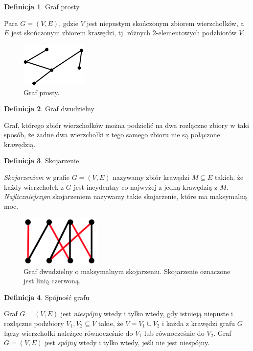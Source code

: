 \documentclass{xmgr}
\theoremstyle{definition}
\newtheorem{Definicja}{Definicja}
\begin{document}
\begin{Definicja}{Graf prosty}

  Para $G = (V,E)$, gdzie $V$ jest niepustym skończonym zbiorem wierzchołków, a $E$ jest skończonym zbiorem krawędzi, tj. różnych 2-elementowych podzbiorów $V$.
\end{Definicja}

\begin{figure}[ht!]
  \centering
  \includegraphics[height=2.2cm]{rysunki/spojny_graf_prosty.png}
    \caption{Graf prosty.}
\end{figure} 

\begin{Definicja}{Graf dwudzielny}

	Graf, którego zbiór wierzchołków można podzielić na dwa rozłączne zbiory w taki sposób, że żadne dwa wierzchołki z tego samego zbioru nie są połączone krawędzią.
\end{Definicja}

\begin{Definicja}{Skojarzenie}

  \emph{Skojarzeniem} w grafie $G=(V,E)$ nazywamy zbiór krawędzi $M \subseteq E$ takich, że każdy wierzchołek z $G$ jest incydentny co najwyżej z jedną krawędzią z $M$. \emph{Najliczniejszym} skojarzeniem nazywamy takie skojarzenie, które ma maksymalną moc.   
\end{Definicja}

\begin{figure}[ht!]
  \centering
  \includegraphics[height=2.5cm]{rysunki/graf_dwudzielny_skojarzenie.png}
    \caption{Graf dwudzielny o maksymalnym skojarzeniu. Skojarzenie oznaczone jest linią czerwoną.}
\end{figure} 

\begin{Definicja}{Spójność grafu}
  
  Graf $G = (V,E)$ jest \emph{niespójny} wtedy i tylko wtedy, gdy istnieją niepuste i rozłączne podzbiory $V_1, V_2 \subseteq V$ takie, że $V = V_1 \cup V_2$ i każda z krawędzi grafu $G$ łączy wierzchołki należące równocześnie do $V_1$ lub równocześnie do $V_2$. Graf $G = (V,E)$ jest \emph{spójny} wtedy i tylko wtedy, jeśli nie jest niespójny.
\end{Definicja}
\end{document}
